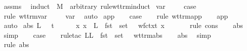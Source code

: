 \begin{isabellebody}
%
\isadelimproof
%
\endisadelimproof
%
\isatagproof
{}\isamarkupfalse%
\ assms\ \isamarkupfalse%
\ {\isacharparenleft}induct\ {\isasymGamma}\ M\ {\isasymsigma}\ arbitrary{\isacharcolon}{\isasymGamma}{\isacharprime}\ rule{\isacharcolon}wt{\isacharunderscore}trm{\isachardot}induct{\isacharparenright}\isanewline
{}\isamarkupfalse%
\ var\ \isanewline
\ \ \isamarkupfalse%
\ {\isacharquery}case\ \isanewline
\ \ \isamarkupfalse%
\ {\isacharparenleft}rule\ wt{\isacharunderscore}trm{\isachardot}var{\isacharparenright}\ \isanewline
\ \ \isamarkupfalse%
\ var\ \isamarkupfalse%
\ auto\isanewline
{}\isamarkupfalse%
\isanewline
{}\isamarkupfalse%
\ app\isanewline
\ \ \isamarkupfalse%
\ {\isacharquery}case\isanewline
\ \ \isamarkupfalse%
\ {\isacharparenleft}rule\ wt{\isacharunderscore}trm{\isachardot}app{\isacharparenright}\isanewline
\ \ \isamarkupfalse%
\ app\ \isamarkupfalse%
\ auto\isanewline
{}\isamarkupfalse%
\isanewline
{}\isamarkupfalse%
\ {\isacharparenleft}abs\ L\ {\isasymsigma}\ {\isasymGamma}\ t\ {\isasymtau}{\isacharparenright}\isanewline
\ \ \isamarkupfalse%
\ {}{\isacharcolon}\ {\isachardoublequoteopen}{\isasymAnd}x{\isachardot}\ x\ {\isasymnotin}\ {\isacharparenleft}L\ {\isasymunion}\ fst\ {\isacharbackquote}\ set\ {\isasymGamma}{\isacharprime}{\isacharparenright}\ {\isasymLongrightarrow}\ wf{\isacharunderscore}ctxt\ {\isacharparenleft}{\isacharparenleft}x{\isacharcomma}\ {\isasymsigma}{\isacharparenright}\ {\isacharhash}\ {\isasymGamma}{\isacharprime}{\isacharparenright}{\isachardoublequoteclose}\isanewline
\ \ \isamarkupfalse%
\ {\isacharparenleft}rule\ cons{\isacharparenright}\isanewline
\ \ \isamarkupfalse%
\ abs\ \isamarkupfalse%
\ simp{\isacharplus}\isanewline
\isanewline
\ \ \isamarkupfalse%
\ {\isacharquery}case\isanewline
\ \ \isamarkupfalse%
\ {\isacharparenleft}rule{\isacharunderscore}tac\ L{\isacharequal}{\isachardoublequoteopen}L\ {\isasymunion}\ fst\ {\isacharbackquote}\ set\ {\isasymGamma}{\isacharprime}{\isachardoublequoteclose}\ \ wt{\isacharunderscore}trm{\isachardot}abs{\isacharparenright}\isanewline
\ \ \isamarkupfalse%
\ abs\ \isamarkupfalse%
\ simp\isanewline
\ \ \isamarkupfalse%
\ {\isacharparenleft}rule\ abs{\isacharparenleft}{}{\isacharparenright}{\isacharparenright}\isanewline

\end{isabellebody}
